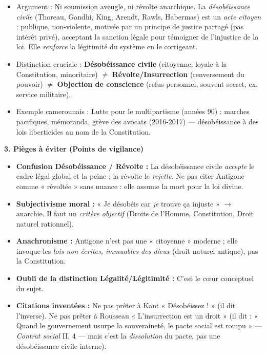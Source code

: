 \documentclass[11pt]{article}
\begin{document}
\begin{corrige}
\begin{enumerate}
    \begin{itemize}
        \item Argument : Ni soumission aveugle, ni révolte anarchique. La \emph{désobéissance civile} (Thoreau, Gandhi, King, Arendt, Rawls, Habermas) est un \emph{acte citoyen} : publique, non-violente, motivée par un principe de justice partagé (pas intérêt privé), acceptant la sanction légale pour témoigner de l'injustice de la loi. Elle \emph{renforce} la légitimité du système en le corrigeant.
        \item Distinction cruciale : \textbf{Désobéissance civile} (citoyenne, loyale à la Constitution, minoritaire) $\neq$ \textbf{Révolte/Insurrection} (renversement du pouvoir) $\neq$ \textbf{Objection de conscience} (refus personnel, souvent secret, ex. service militaire).
        \item Exemple camerounais : Lutte pour le multipartisme (années 90) : marches pacifiques, mémoranda, grève des avocats (2016-2017) — désobéissance à des lois liberticides au nom de la Constitution.
    \end{itemize}
\end{enumerate}

\textbf{3. Pièges à éviter (Points de vigilance)}
\begin{itemize}
    \item \textbf{Confusion Désobéissance / Révolte :} La désobéissance civile \emph{accepte} le cadre légal global et la peine ; la révolte le \emph{rejette}. Ne pas citer Antigone comme « révoltée » sans nuance : elle assume la mort pour la loi divine.
    \item \textbf{Subjectivisme moral :} « Je désobéis car \emph{je} trouve ça injuste » $\rightarrow$ anarchie. Il faut un \emph{critère objectif} (Droits de l'Homme, Constitution, Droit naturel rationnel).
    \item \textbf{Anachronisme :} Antigone n'est pas une « citoyenne » moderne ; elle invoque les \emph{lois non écrites, immuables des dieux} (droit naturel antique), pas la Constitution.
    \item \textbf{Oubli de la distinction Légalité/Légitimité :} C'est le cœur conceptuel du sujet.
    \item \textbf{Citations inventées :} Ne pas prêter à Kant « Désobéissez ! » (il dit l'inverse). Ne pas prêter à Rousseau « L'insurrection est un droit » (il dit : « Quand le gouvernement usurpe la souveraineté, le pacte social est rompu » — \emph{Contrat social} II, 4 — mais c'est la \emph{dissolution} du pacte, pas une désobéissance civile interne).
\end{itemize}
\end{corrige}
\end{document}
